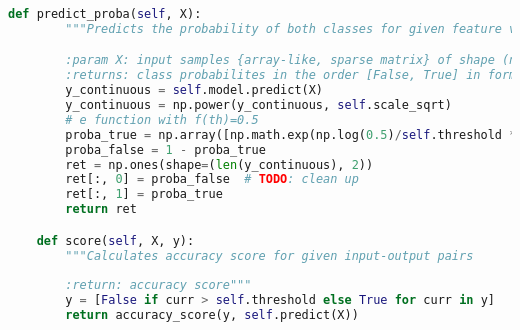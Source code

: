 \begin{lstlisting}[language=Python, basicstyle=\scriptsize, tabsize=4]
    def predict_proba(self, X):
        """Predicts the probability of both classes for given feature vectors

        :param X: input samples {array-like, sparse matrix} of shape (n_samples, n_features}
        :returns: class probabilites in the order [False, True] in form (n_samples,2)"""
        y_continuous = self.model.predict(X)
        y_continuous = np.power(y_continuous, self.scale_sqrt)
        # e function with f(th)=0.5
        proba_true = np.array([np.math.exp(np.log(0.5)/self.threshold * y) for y in y_continuous])
        proba_false = 1 - proba_true
        ret = np.ones(shape=(len(y_continuous), 2))
        ret[:, 0] = proba_false  # TODO: clean up
        ret[:, 1] = proba_true
        return ret

    def score(self, X, y):
        """Calculates accuracy score for given input-output pairs
        
        :return: accuracy score"""
        y = [False if curr > self.threshold else True for curr in y]
        return accuracy_score(y, self.predict(X))
\end{lstlisting}
